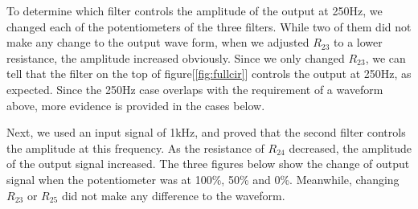 \phantom{ } To determine which filter controls the amplitude of the output at 250Hz, we changed each of the potentiometers of the three filters. While two of them did not make any change to the output wave form, when we adjusted $R_23$ to a lower resistance, the amplitude increased obviously. Since we only changed $R_23$, we can tell that the filter on the top of figure[\ref{fig:fullcir}] controls the output at 250Hz, as expected. Since the 250Hz case overlaps with the requirement of a waveform above, more evidence is provided in the cases below.

\phantom{ } Next, we used an input signal of 1kHz, and proved that the second filter controls the amplitude at this frequency. As the resistance of $R_24$ decreased, the amplitude of the output signal increased. The three figures below show the change of output signal when the potentiometer was at 100\%, 50\% and 0\%. Meanwhile, changing $R_23$ or $R_25$ did not make any difference to the waveform.

